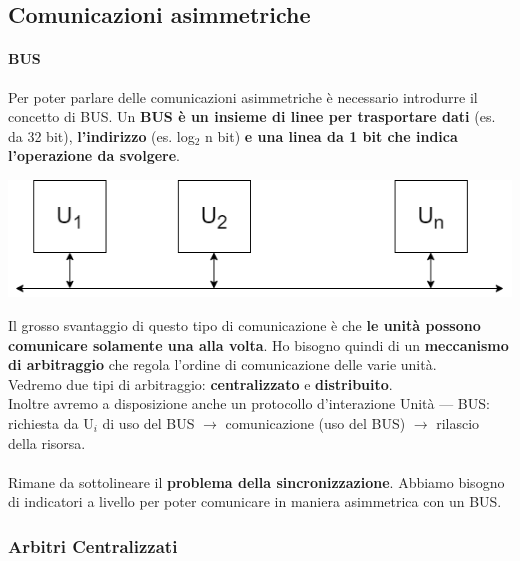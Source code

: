 \documentclass[10pt]{report}
\begin{document}
\subsection{Comunicazioni asimmetriche}
\paragraph{BUS} Per poter parlare delle comunicazioni asimmetriche è necessario introdurre il concetto di BUS. Un \textbf{BUS è un insieme di linee per trasportare dati} (es. da 32 bit), \textbf{l'indirizzo} (es. log$_2$ n bit) \textbf{e una linea da 1 bit che indica l'operazione da svolgere}.
\begin{center}
\includegraphics[scale=0.9]{bus.png}
\end{center}
\pagebreak
Il grosso svantaggio di questo tipo di comunicazione è che \textbf{le unità possono comunicare solamente una alla volta}. Ho bisogno quindi di un \textbf{meccanismo di arbitraggio} che regola l'ordine di comunicazione delle varie unità.\\
Vedremo due tipi di arbitraggio: \textbf{centralizzato} e \textbf{distribuito}.\\
Inoltre avremo a disposizione anche un protocollo d'interazione Unità --- BUS:\\richiesta da U$_i$ di uso del BUS $\rightarrow$ comunicazione (uso del BUS) $\rightarrow$ rilascio della risorsa.\\\\
Rimane da sottolineare il \textbf{problema della sincronizzazione}. Abbiamo bisogno di indicatori a livello per poter comunicare in maniera asimmetrica con un BUS.
\subsubsection{Arbitri Centralizzati}
\end{document}
